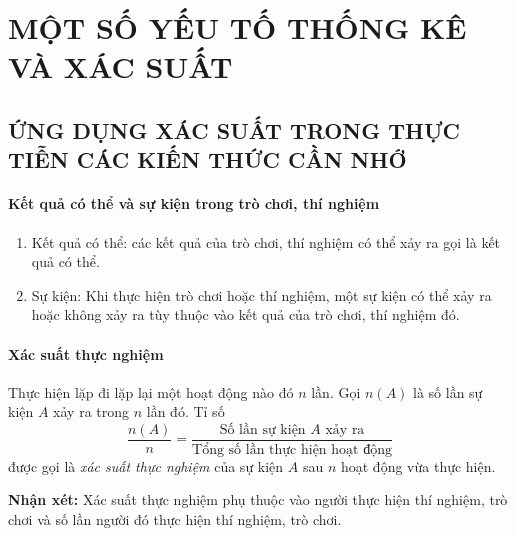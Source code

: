 \def\i{\item}
\graphicspath{{../pictures/c5/}}
\chapter{MỘT SỐ YẾU TỐ THỐNG KÊ VÀ XÁC SUẤT}
\section{ỨNG DỤNG XÁC SUẤT TRONG THỰC TIỄN CÁC KIẾN THỨC CẦN NHỚ}
\subsubsection{Kết quả có thể và sự kiện trong trò chơi, thí nghiệm}
\begin{enumerate}[--,leftmargin=*]
	\i Kết quả có thể: các kết quả của trò chơi, thí nghiệm có thể xảy ra gọi là kết quả có thể.
	\i Sự kiện: Khi thực hiện trò chơi hoặc thí nghiệm, một sự kiện có thể xảy ra hoặc không xảy ra tùy thuộc vào kết quả của trò chơi, thí nghiệm đó.
\end{enumerate}
\subsubsection{Xác suất thực nghiệm} 
Thực hiện lặp đi lặp lại một hoạt động nào đó $n$ lần. Gọi $n(A)$ là số lần sự kiện $A$ xảy ra trong $n$ lần đó. Tỉ số
\[\dfrac{n(A)}{n} = \dfrac{\text{Số lần sự kiện $A$ xảy ra}}{\text{Tổng số lần thực hiện hoạt động}}\] 
được gọi là \textit{xác suất thực nghiệm} của sự kiện $A$ sau $n$ hoạt động vừa thực hiện.

\textbf{Nhận xét:} Xác suất thực nghiệm phụ thuộc vào người thực hiện thí nghiệm, trò chơi và số lần người đó thực hiện thí nghiệm, trò chơi.
